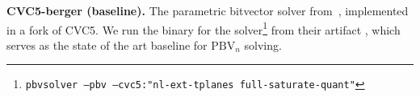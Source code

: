 \noindent\textbf{CVC5-berger (baseline).}
The parametric bitvector solver from~\citet{bit-precise-parametric-bv},
implemented in a fork of CVC5. We run the binary for the solver\footnote{\texttt{pbvsolver --pbv --cvc5:"nl-ext-tplanes full-saturate-quant"}}  from their artifact
\cite{zohar_2025_15143242}, which serves as the state of the art baseline for $\text{PBV}_n$ solving.

% 
%
%


